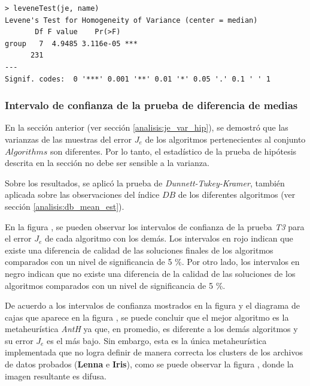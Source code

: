 \begin{lstlisting}[float=h!, caption={Diferencia de Varianza: Cuantificación del error Je}, label=r_je_var_img]
> leveneTest(je, name)
Levene's Test for Homogeneity of Variance (center = median)
       Df F value    Pr(>F)    
group   7  4.9485 3.116e-05 ***
      231                      
---
Signif. codes:  0 '***' 0.001 '**' 0.01 '*' 0.05 '.' 0.1 ' ' 1 
\end{lstlisting}

\subsubsection{Intervalo de confianza de la prueba de diferencia de medias}\label{analisis:je_mean_est}

    En la sección anterior (ver sección \ref{analisis:je_var_hip}), se demostró
que las varianzas de las muestras del error $J_e$ de los algoritmos pertenecientes
al conjunto $Algorithms$ son diferentes. Por lo tanto, el estadístico de la
prueba de hipótesis descrita en la sección \label{analisis:je_mean_hip} no debe
ser sensible a la varianza.

    Sobre los resultados, se aplicó la prueba de \emph{Dunnett-Tukey-Kramer}, también
aplicada sobre las observaciones del índice $DB$ de los diferentes algoritmos
(ver sección \ref{analisis:db_mean_est}).

    En la figura , se pueden observar los intervalos de
confianza de la prueba \emph{T3} para el error $J_e$ de cada algoritmo con los
demás. Los intervalos en rojo indican que existe una diferencia de calidad de las
soluciones finales de los algoritmos comparados con un nivel de significancia de
5 \%. Por otro lado, los intervalos en negro indican que no existe una diferencia
de la calidad de las soluciones de los algoritmos comparados con un nivel de 
significancia de 5 \%.

    De acuerdo a los intervalos de confianza mostrados en la figura
 y el diagrama de cajas que aparece en la figura
, se puede concluir que el mejor algoritmo es la
metaheurística \emph{AntH} ya que, en promedio, es diferente a los demás algoritmos
y su error $J_e$ es el más bajo. Sin embargo, esta es la única metaheurística
implementada que no logra definir de manera correcta los clusters de los archivos
de datos probados (\textbf{Lenna} e \textbf{Iris}), como se puede observar la
figura , donde la imagen resultante es difusa.


